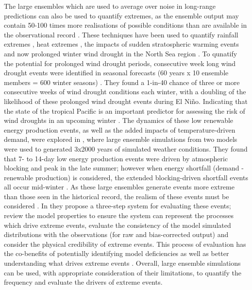\documentclass{article}
\begin{document}
The large ensembles which are used to average over noise in long-range predictions can also be used to quantify extremes, as the ensemble output may contain 50-100 times more realisations of possible conditions than are available in the observational record \parencite{thompson2017high}. These techniques have been used to quantify rainfall extremes \parencite{thompson2017high,kent2022estimating,jain2020current}, heat extremes \parencite{thompson2019risk,kay2020current}, the impacts of sudden stratospheric warming events \parencite{bett2023using} and now prolonged winter wind drought in the North Sea region \parencite{kay2023variability}. To qunatify the potential for prolonged wind drought periods, consecutive week long wind drought events were identified in seasonal forecasts (60 years x 10 ensemble members = 600 winter seasons) \parencite{kay2023variability}. They found a 1-in-40 chance of three or more consecutive weeks of wind drought conditions each winter, with a doubling of the likelihood of these prolonged wind drought events during El Niño. Indicating that the state of the tropical Pacific is an important predictor for assessing the risk of wind droughts in an upcoming winter \parencite{kay2023variability}. The dynamics of these low renewable energy production events, as well as the added impacts of temperature-driven demand, were explored in \cite{van2019meteorological}, where large ensemble simulations from two models were used to generated 3x2000 years of simulated weather conditions. They found that 7- to 14-day low energy production events were driven by atmospheric blocking and peak in the late summer; however when energy shortfall (demand - renewable production) is considered, the extended blocking-driven shortfall events all occur mid-winter \parencite{van2019meteorological}. As these large ensembles generate events more extreme than those seen in the historical record, the realism of these events must be considered \parencite{kelder2022interpreting}. In \cite{kelder2022interpreting} they propose a three-step system for evaluating these events; review the model properties to ensure the system can represent the processes which drive extreme events, evaluate the consistency of the model simulated distributions with the observations (for raw and bias-corrected output) and consider the physical credibility of extreme events. This process of evaluation has the co-benefits of potentially identifying model deficiencies as well as better understanding what drives extreme events \parencite{kelder2022interpreting}. Overall, large ensemble simulations can be used, with appropriate consideration of their limitations, to quantify the frequency and evaluate the drivers of extreme events.
\end{document}
